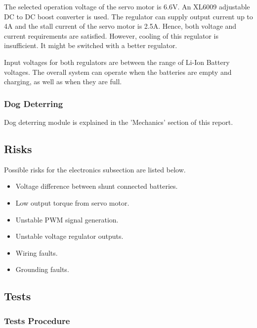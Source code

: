 The selected operation voltage of the servo motor is 6.6V. An XL6009 adjustable DC to DC boost converter is used. The regulator can supply output current up to 4A and the stall current of the servo motor is 2.5A. Hence, both voltage and current requirements are satisfied. However, cooling of this regulator is insufficient. It might be switched with a better regulator.

Input voltages for both regulators are between the range of Li-Ion Battery voltages. The overall system can operate when the batteries are empty and charging, as well as when they are full.

  \subsubsection{Dog Deterring}
  
Dog deterring module is explained in the 'Mechanics' section of this report.

\subsection{Risks}

Possible risks for the electronics subsection are listed below.

\begin{itemize}
\item Voltage difference between shunt connected batteries.
\item Low output torque from servo motor.
\item Unstable PWM signal generation. 
\item Unstable voltage regulator outputs.
\item Wiring faults.
\item Grounding faults.
\end{itemize}


\subsection{Tests}


  \subsubsection{Tests Procedure}
  
